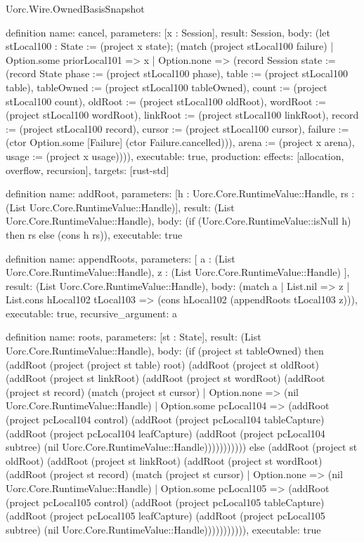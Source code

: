 \begin{lexlean}{Uorc.Wire.OwnedBasisSnapshot}
\begin{semanticmodule}
definition{
  name: cancel,
  parameters: [x : Session],
  result: Session,
  body: (let stLocal100 : State := (project x state); (match (project stLocal100 failure)
    | Option.some priorLocal101 => x
    | Option.none => (record Session {state := (record State {phase := (project stLocal100 phase), table := (project stLocal100 table), tableOwned := (project stLocal100 tableOwned), count := (project stLocal100 count), oldRoot := (project stLocal100 oldRoot), wordRoot := (project stLocal100 wordRoot), linkRoot := (project stLocal100 linkRoot), record := (project stLocal100 record), cursor := (project stLocal100 cursor), failure := (ctor Option.some [Failure] (ctor Failure.cancelled))}), arena := (project x arena), usage := (project x usage)}))),
  executable: true,
  production: {effects: [allocation, overflow, recursion], targets: [rust-std]}
}

definition{
  name: addRoot,
  parameters: [h : Uorc.Core.RuntimeValue::Handle, rs : (List Uorc.Core.RuntimeValue::Handle)],
  result: (List Uorc.Core.RuntimeValue::Handle),
  body: (if (Uorc.Core.RuntimeValue::isNull h) then rs else (cons h rs)),
  executable: true
}

definition{
  name: appendRoots,
  parameters: [
    a : (List Uorc.Core.RuntimeValue::Handle),
    z : (List Uorc.Core.RuntimeValue::Handle)
  ],
  result: (List Uorc.Core.RuntimeValue::Handle),
  body: (match a
    | List.nil => z
    | List.cons hLocal102 tLocal103 => (cons hLocal102 (appendRoots tLocal103 z))),
  executable: true,
  recursive_argument: a
}

definition{
  name: roots,
  parameters: [st : State],
  result: (List Uorc.Core.RuntimeValue::Handle),
  body: (if (project st tableOwned) then (addRoot (project (project st table) root) (addRoot (project st oldRoot) (addRoot (project st linkRoot) (addRoot (project st wordRoot) (addRoot (project st record) (match (project st cursor)
    | Option.none => (nil Uorc.Core.RuntimeValue::Handle)
    | Option.some pcLocal104 => (addRoot (project pcLocal104 control) (addRoot (project pcLocal104 tableCapture) (addRoot (project pcLocal104 leafCapture) (addRoot (project pcLocal104 subtree) (nil Uorc.Core.RuntimeValue::Handle))))))))))) else (addRoot (project st oldRoot) (addRoot (project st linkRoot) (addRoot (project st wordRoot) (addRoot (project st record) (match (project st cursor)
    | Option.none => (nil Uorc.Core.RuntimeValue::Handle)
    | Option.some pcLocal105 => (addRoot (project pcLocal105 control) (addRoot (project pcLocal105 tableCapture) (addRoot (project pcLocal105 leafCapture) (addRoot (project pcLocal105 subtree) (nil Uorc.Core.RuntimeValue::Handle))))))))))),
  executable: true
}


\end{semanticmodule}
\end{lexlean}
